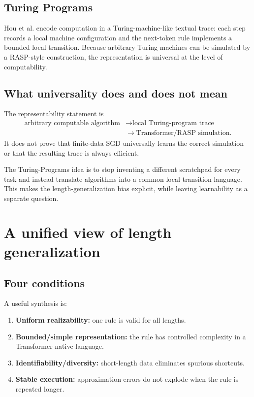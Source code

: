 \documentclass[11pt,a4paper,oneside,openany]{memoir}
\theoremstyle{definition}
\begin{document}
\section{Turing Programs}
Hou et al. encode computation in a Turing-machine-like textual trace: each step records a local machine configuration and the next-token rule implements a bounded local transition.  Because arbitrary Turing machines can be simulated by a RASP-style construction, the representation is universal at the level of computability.

\section{What universality does and does not mean}
The representability statement is
\[
\begin{aligned}
\text{arbitrary computable algorithm}
&\longrightarrow \text{local Turing-program trace}\\
&\longrightarrow \text{Transformer/RASP simulation}.
\end{aligned}
\]
It does not prove that finite-data SGD universally learns the correct simulation or that the resulting trace is always efficient.

\begin{presentbox}
The Turing-Programs idea is to stop inventing a different scratchpad for every task and instead translate algorithms into a common local transition language.  This makes the length-generalization bias explicit, while leaving learnability as a separate question.
\end{presentbox}

\chapter{A unified view of length generalization}
\section{Four conditions}
A useful synthesis is:
\begin{enumerate}
\item \textbf{Uniform realizability:} one rule is valid for all lengths.
\item \textbf{Bounded/simple representation:} the rule has controlled complexity in a Transformer-native language.
\item \textbf{Identifiability/diversity:} short-length data eliminates spurious shortcuts.
\item \textbf{Stable execution:} approximation errors do not explode when the rule is repeated longer.
\end{enumerate}
\end{document}
